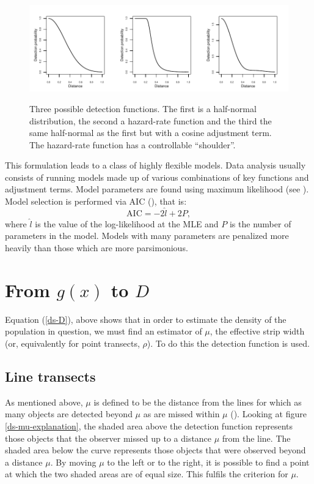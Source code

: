 \begin{figure}
\centering
\includegraphics{intro/figs/detfct-examples.pdf}\\
\caption{Three possible detection functions. The first is a half-normal distribution, the second a hazard-rate function and the third the same half-normal as the first but with a cosine adjustment term. The hazard-rate function has a controllable ``shoulder''.}
\label{ds-detfct-examples}
\end{figure}

This formulation leads to a class of highly flexible models. Data analysis usually consists of running models made up of various combinations of key functions and adjustment terms. Model parameters are found using maximum likelihood (see ). Model selection is performed via AIC (\cite[p. 69]{IDS}), that is:
\begin{equation}
\text{AIC} = -2 \hat{l} + 2P,
\label{DEFN-AIC}
\end{equation}
where $\hat{l}$ is the value of the log-likelihood at the MLE and $P$ is the number of parameters in the model. Models with many parameters are penalized more heavily than those which are more parsimonious.\label{cor-5s8}

\section{From $g(x)$ to $D$}
\label{gtoD}
Equation (\ref{ds-D}), above shows that in order to estimate the density of the population in question, we must find an estimator of $\mu$, the effective strip width (or, equivalently for point transects, $\rho$). To do this the detection function is used.

\subsection{Line transects} 
As mentioned above, $\mu$ is defined to be the distance from the lines for which as many objects are detected beyond $\mu$ as are missed within $\mu$ (\cite{eenviron}). Looking at figure \ref{ds-mu-explanation}, the shaded area above the detection function represents those objects that the observer missed up to a distance $\mu$ from the line. The shaded area below the curve represents those objects that were observed beyond a distance $\mu$. By moving $\mu$ to the left or to the right, it is possible to find a point at which the two shaded areas are of equal size. This fulfils the criterion for $\mu$.

